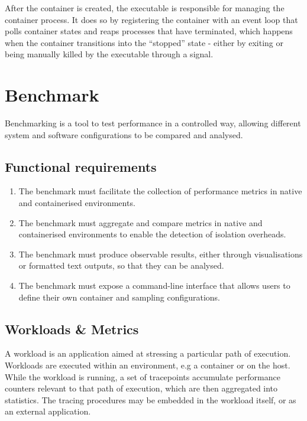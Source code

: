 After the container is created, the executable is responsible for 
managing the container process. It does so by registering the container with an event loop that
polls container states and reaps processes that have terminated, which happens when the container 
transitions into the \enquote{stopped} state - either by exiting or being manually killed by the executable through 
a signal. 
\section{Benchmark}
Benchmarking is a tool to test performance in a controlled way, allowing different 
system and software configurations to be compared and analysed.

\subsection{Functional requirements}
\begin{enumerate}[i]
    \item The benchmark must facilitate the collection of performance metrics in native and containerised environments.
    \label{requirements:functional/benchmark/1} 
    \item The benchmark must aggregate and compare metrics in native and containerised environments to 
    enable the detection of isolation overheads.
    \label{requirements:functional/benchmark/2}
    \item The benchmark must produce observable results, either through visualisations or formatted text outputs,
    so that they can be analysed.
    \label{requirements:functional/benchmark/3}
    \item The benchmark must expose a command-line interface that allows users to define their own 
    container and sampling configurations.
    \label{requirements:functional/benchmark/4}
\end{enumerate}

\subsection{Workloads \& Metrics}
A workload is an application aimed at stressing a particular path of execution. 
Workloads are executed within an environment, e.g a container or on the host.
While the workload is running, a set of tracepoints accumulate performance counters relevant to that 
path of execution, which are then aggregated into statistics. 
The tracing procedures may be embedded in the workload itself, or as an external application. 

